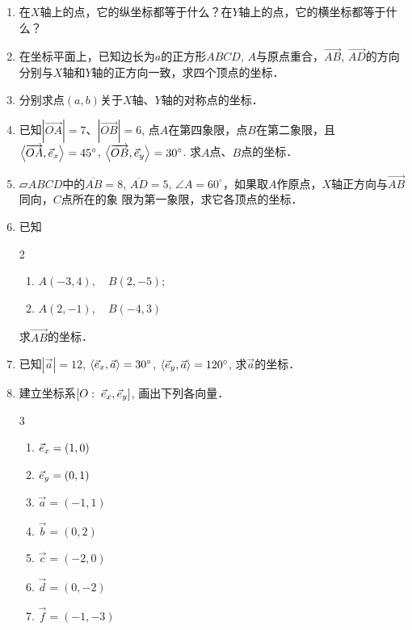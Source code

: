 \begin{enumerate}
    \item 在$X$轴上的点，它的纵坐标都等于什么？在$Y$轴上的点，它的横坐标都等于什么？
    \item 在坐标平面上，已知边长为$a$的正方形$ABCD$, $A$与原点重合，$\Vec{AB}$, $\Vec{AD}$的方向分别与$X$轴和$Y$轴的正方向一致，求四个顶点的坐标．
    \item 分别求点$(a,b)$关于$X$轴、$Y$轴的对称点的坐标．
    \item 已知$|\Vec{OA}|=7$、$|\Vec{OB}|=6$, 点$A$在第四象限，点$B$在第二象限，且$\left\langle \overrightarrow{OA},\vec{e}_x \right\rangle=45^{\circ}$, $\left\langle \overrightarrow{OB},\vec{e}_y \right\rangle=30^{\circ}$. 求$A$点、$B$点的坐标．
    \item $\parallelogram{ABCD}$中的$\overline{AB}=8$, $\overline{AD}=5$, $\angle A=60^{\circ}$，如果取$A$作原点，$X$轴正方向与$\Vec{AB}$同向，$C$点所在的象
    限为第一象限，求它各顶点的坐标．
    \item 已知
\begin{multicols}{2}
\begin{enumerate}
    \item $A(-3, 4),\quad B(2,-5)$; 
    \item $A(2,-1),\quad B(-4, 3)$
\end{enumerate}
\end{multicols}
    求$\Vec{AB}$的坐标．
    
\item 已知$|\vec{a}|=12$, $\left\langle \vec{e}_x,\vec{a} \right\rangle=30^{\circ}$, $\left\langle \vec{e}_y,\vec{a} \right\rangle=120^{\circ}$, 
    求$\vec{a}$的坐标．
    
    \item 建立坐标系$[O:\; \vec{e}_x,\vec{e}_y]$, 画出下列各向量．
\begin{multicols}{3}
\begin{enumerate}
    \item $\vec{e}_x=(1,0)$
    \item $\vec{e}_y=(0,1)$
    \item $\vec{a}=(-1,1)$
    \item $\vec{b}=(0,2)$
    \item $\vec{c}=(-2,0)$
    \item $\vec{d}=(0,-2)$
    \item $\vec{f}=(-1,-3)$
\end{enumerate}
\end{multicols}


\end{enumerate}
